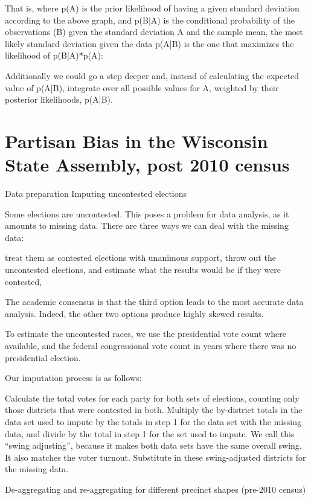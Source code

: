 \documentclass[preprint,12pt]{article}
\begin{document}
That is, where p(A) is the prior likelihood of having a given standard deviation according to the above graph, and p(B|A) is the conditional probability of the observations (B) given the standard deviation A and the sample mean, the most likely standard deviation given the data p(A|B) is the one that maximizes the likelihood of p(B|A)*p(A): 
 

 
Additionally we could go a step deeper and, instead of calculating the expected value of p(A|B), integrate over all possible values for A, weighted by their posterior likelihoods, p(A|B).


\section{Partisan Bias in the Wisconsin State Assembly, post 2010 census\label{sec:Wis}}

Data preparation
Imputing uncontested elections
 
Some elections are uncontested.   This poses a problem for data analysis, as it amounts to missing data.  There are three ways we can deal with the missing data: 
 
treat them as contested elections with unanimous support, 
throw out the uncontested elections, and 
estimate what the results would be if they were contested, 
 
The academic consensus is that the third option leads to the most accurate data analysis.  Indeed, the other two options produce highly skewed results.
 
To estimate the uncontested races, we use the presidential vote count where available, and the federal congressional vote count in years where there was no presidential election.
 
Our imputation process is as follows:
 
Calculate the total votes for each party for both sets of elections, counting only those districts that were contested in both.
Multiply the by-district totals in the data set used to impute by the totals in step 1 for the data set with the missing data, and divide by the total in step 1 for the set used to impute.  We call this “swing adjusting”, because it makes both data sets have the same overall swing.  It also matches the voter turnout.
Substitute in these swing-adjusted districts for the missing data.
 
De-aggregating and re-aggregating for different precinct shapes (pre-2010 census)
 
\end{document}
